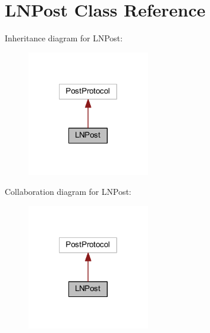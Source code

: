 \hypertarget{class_l_n_post}{\section{L\-N\-Post Class Reference}
\label{class_l_n_post}
}


Inheritance diagram for L\-N\-Post\-:
\nopagebreak
\begin{figure}[H]
\begin{center}
\leavevmode
\includegraphics[width=152pt]{class_l_n_post__inherit__graph}
\end{center}
\end{figure}


Collaboration diagram for L\-N\-Post\-:
\nopagebreak
\begin{figure}[H]
\begin{center}
\leavevmode
\includegraphics[width=152pt]{class_l_n_post__coll__graph}
\end{center}
\end{figure}

